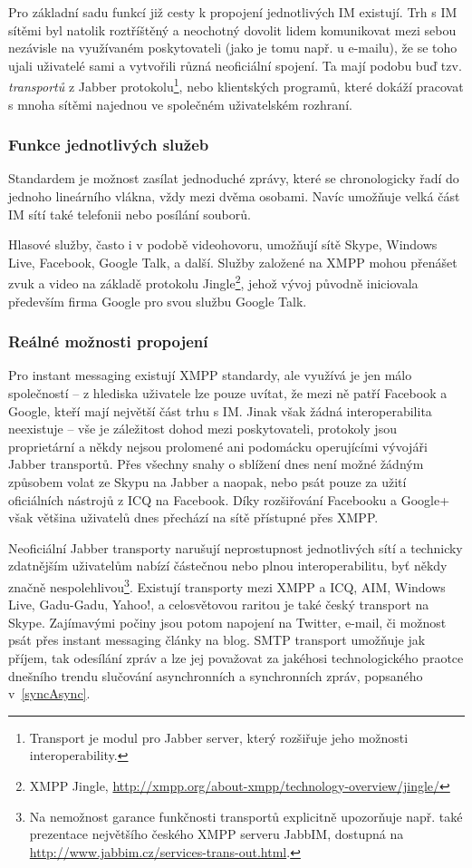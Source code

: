 \documentclass[12pt,oneside,final]{fithesis2}
\begin{document}
Pro základní sadu funkcí již cesty k propojení jednotlivých IM existují. Trh s IM sítěmi byl natolik roztříštěný a neochotný dovolit lidem komunikovat mezi sebou nezávisle na využívaném poskytovateli (jako je tomu např. u e-mailu), že se toho ujali uživatelé sami a vytvořili různá neoficiální spojení. Ta mají podobu buď tzv. \emph{transportů} z Jabber protokolu\footnote{Transport je modul pro Jabber server, který rozšiřuje jeho možnosti interoperability.}, nebo klientských programů, které dokáží pracovat s mnoha sítěmi najednou ve společném uživatelském rozhraní.

\subsubsection*{Funkce jednotlivých služeb}
Standardem je možnost zasílat jednoduché zprávy, které se chronologicky řadí do jednoho lineárního vlákna, vždy mezi dvěma osobami. Navíc umožňuje velká část IM sítí také telefonii nebo posílání souborů.

Hlasové služby, často i v podobě videohovoru, umožňují sítě Skype, Windows Live, Facebook, Google Talk, a další. Služby založené na XMPP mohou přenášet zvuk a video na základě protokolu Jingle\footnote{XMPP Jingle, \url{http://xmpp.org/about-xmpp/technology-overview/jingle/}}, jehož vývoj původně iniciovala především firma Google pro svou službu Google Talk.

\subsubsection*{Reálné možnosti propojení}
Pro instant messaging existují XMPP standardy, ale využívá je jen málo společností -- z hlediska uživatele lze pouze uvítat, že mezi ně patří Facebook a Google, kteří mají největší část trhu s IM. Jinak však žádná interoperabilita neexistuje -- vše je záležitost dohod mezi poskytovateli, protokoly jsou proprietární a někdy nejsou prolomené ani podomácku operujícími vývojáři Jabber transportů. Přes všechny snahy o sblížení dnes není možné žádným způsobem volat ze Skypu na Jabber a naopak, nebo psát pouze za užití oficiálních nástrojů z ICQ na Facebook. Díky rozšiřování Facebooku a Google+ však většina uživatelů dnes přechází na sítě přístupné přes XMPP.

Neoficiální Jabber transporty narušují neprostupnost jednotlivých sítí a technicky zdatnějším uživatelům nabízí částečnou nebo plnou interoperabilitu, byť někdy značně nespolehlivou\footnote{Na nemožnost garance funkčnosti transportů explicitně upozorňuje např. také prezentace největšího českého XMPP serveru JabbIM, dostupná na \url{http://www.jabbim.cz/services-trans-out.html}.}. Existují transporty mezi XMPP a ICQ, AIM, Windows Live, Gadu-Gadu, Yahoo!, a celosvětovou raritou je také český transport na Skype. Zajímavými počiny jsou potom napojení na Twitter, e-mail, či možnost psát přes instant messaging články na blog. SMTP transport umožňuje jak příjem, tak odesílání zpráv a lze jej považovat za jakéhosi technologického praotce dnešního trendu slučování asynchronních a synchronních zpráv, popsaného v~\ref{syncAsync}.
\end{document}
